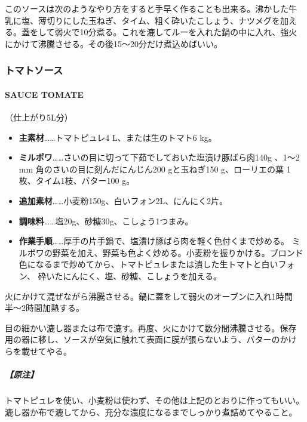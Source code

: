 \begin{recette}
このソースは次のようなやり方をすると手早く作ることも出来る。沸かした牛
乳に塩、薄切りにした玉ねぎ、タイム、粗く砕いたこしょう、ナツメグを加え
る。蓋をして弱火で10分煮る。これを漉してルーを入れた鍋の中に入れ、強火
にかけて沸騰させる。その後15〜20分だけ煮込めばいい。

\maeaki

\hypertarget{ux30c8ux30deux30c8ux30bdux30fcux30b9}{%
\subsubsection{トマトソース}\label{ux30c8ux30deux30c8ux30bdux30fcux30b9}}

\hypertarget{sauce-tomate}{%
\paragraph{SAUCE TOMATE}\label{sauce-tomate}}

  
 

（仕上がり5L分）

\begin{itemize}
\item
  \textbf{主素材}\ldots{}\ldots{}トマトピュレ4 L、または生のトマト6 kg。
\item
  \textbf{ミルポワ}\ldots{}\ldots{}さいの目に切って下茹でしておいた塩漬け豚ばら肉140g
  、1〜2 mm 角のさいの目に刻んだにんじん200 gと玉ねぎ150 g、ローリエの葉
  1枚、タイム1枝、バター100 g。
\item
  \textbf{追加素材}\ldots{}\ldots{}小麦粉150g、白いフォン2L、にんにく2片。
\item
  \textbf{調味料}\ldots{}\ldots{}塩20g、砂糖30g、こしょう1つまみ。
\item
  \textbf{作業手順}\ldots{}\ldots{}厚手の片手鍋で、塩漬け豚ばら肉を軽く色付くまで炒める。
  ミルポワの野菜を加え、野菜も色よく炒める。小麦粉を振りかける。ブロンド
  色になるまで炒めてから、トマトピュレまたは潰した生トマトと白いフォン、
  砕いたにんにく、塩、砂糖、こしょうを加える。
\end{itemize}

火にかけて混ぜながら沸騰させる。鍋に蓋をして弱火のオーブンに入れ1時間
半〜2時間加熱する。

目の細かい漉し器または布で漉す。再度、火にかけて数分間沸騰させる。保存
用の器に移し、ソースが空気に触れて表面に膜が張らないよう、バターのかけ
らを載せてやる。

\hypertarget{ux539fux6ce8-4}{%
\subparagraph{【原注】}\label{ux539fux6ce8-4}}

トマトピュレを使い、小麦粉は使わず、その他は上記のとおりに作ってもいい。
漉し器か布で漉してから、充分な濃度になるまでしっかり煮詰めてやること。
\end{recette}